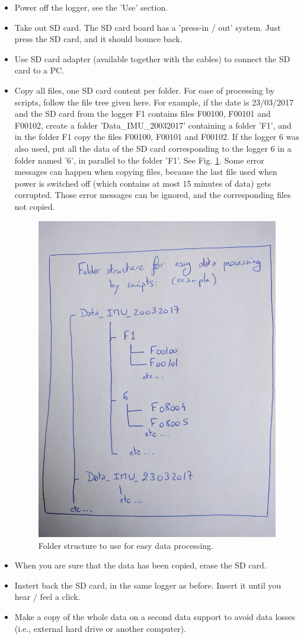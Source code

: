 \documentclass[pdftex,a4paper,12pt,twocolumn,fleqn,captions=tableheading]{scrartcl}
\begin{document}
\begin{itemize}
  \item Power off the logger, see the 'Use' section.

  \item Take out SD card. The SD card board has a 'press-in / out' system. Just press the SD card, and it should bounce back.

  \item Use SD card adapter (available together with the cables) to connect the SD card to a PC.

  \item Copy all files, one SD card content per folder. For ease of processing by scripts, follow the file tree given here. For example, if the date is 23/03/2017 and the SD card from the logger F1 contains files F00100, F00101 and F00102, create a folder 'Data\_IMU\_20032017' containing a folder 'F1', and in the folder F1 copy the files F00100, F00101 and F00102. If the logger 6 was also used, put all the data of the SD card corresponding to the logger 6 in a folder named '6', in parallel to the folder 'F1'. See Fig. \ref{folderstruct}. Some error messages can happen when copying files, because the last file used when power is switched off (which contains at most 15 minutes of data) gets corrupted. Those error messages can be ignored, and the corresponding files not copied.

  \begin{figure}
  \begin{center}
  \includegraphics[width=.4\textwidth]{Figures/IMG_20170418_135351}
  \caption{\label{folderstruct} Folder structure to use for easy data processing.}
  \end{center}
  \end{figure}

  \item When you are sure that the data has been copied, erase the SD card.

  \item Instert back the SD card, in the same logger as before. Insert it until you hear / feel a click.

  \item Make a copy of the whole data on a second data support to avoid data losses (i.e., external hard drive or another computer).

\end{itemize}
\end{document}
